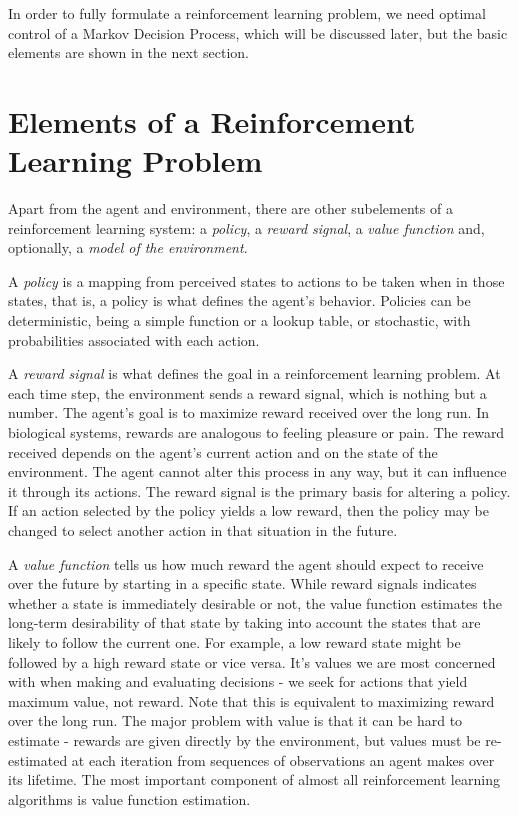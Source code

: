 In order to fully formulate a reinforcement learning problem, we need optimal control of a Markov Decision Process, which will be discussed later, but the basic elements are shown in the next section. 

\section{Elements of a Reinforcement Learning Problem}
Apart from the agent and environment, there are other subelements of a reinforcement learning system: a \textit{policy}, a \textit{reward signal}, a \textit{value function} and, optionally, a \textit{model of the environment}.

A \textit{policy} is a mapping from perceived states to actions to be taken when in those states, that is, a policy is what defines the agent's behavior. Policies can be deterministic, being a simple function or a lookup table, or stochastic, with probabilities associated with each action.

A \textit{reward signal} is what defines the goal in a reinforcement learning problem. At each time step, the environment sends a reward signal, which is nothing but a number. The agent's goal is to maximize reward received over the long run. In biological systems, rewards are analogous to feeling pleasure or pain. The reward received depends on the agent's current action and on the state of the environment. The agent cannot alter this process in any way, but it can influence it through its actions. The reward signal is the primary basis for altering a policy. If an action selected by the policy yields a low reward, then the policy may be changed to select another action in that situation in the future.

A \textit{value function} tells us how much reward the agent should expect to receive over the future by starting in a specific state. While reward signals indicates whether a state is immediately desirable or not, the value function estimates the long-term desirability of that state by taking into account the states that are likely to follow the current one. For example, a low reward state might be followed by a high reward state or vice versa. It's values we are most concerned with when making and evaluating decisions - we seek for actions that yield maximum value, not reward. Note that this is equivalent to maximizing reward over the long run. The major problem with value is that it can be hard to estimate - rewards are given directly by the environment, but values must be re-estimated at each iteration from sequences of observations an agent makes over its lifetime. The most important component of almost all reinforcement learning algorithms is value function estimation.

